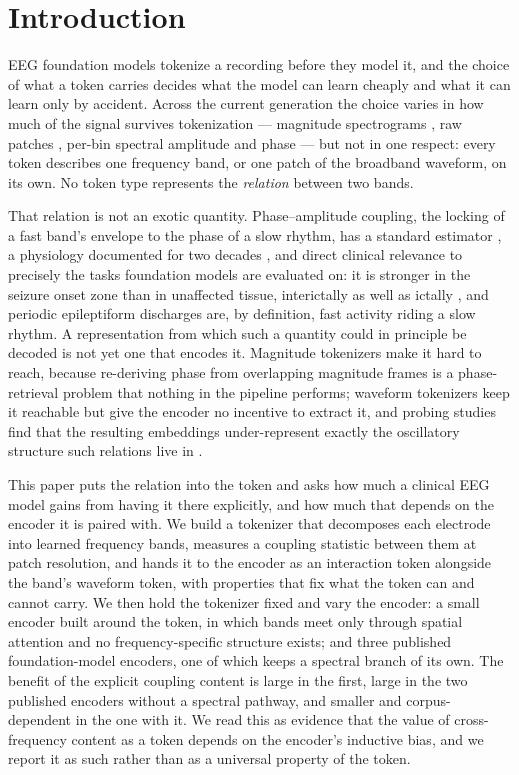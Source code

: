 \section{Introduction}
\label{sec:intro}

EEG foundation models tokenize a recording before they model it, and the
choice of what a token carries decides what the model can learn cheaply and
what it can learn only by accident. Across the current generation the
choice varies in how much of the signal survives tokenization --- magnitude
spectrograms \citep{yang2023biot,pradeepkumar2026tfm}, raw patches
\citep{wang2025cbramod,wang2024eegpt}, per-bin spectral amplitude and phase
\citep{jiang2024labram} --- but not in one respect: every token describes
one frequency band, or one patch of the broadband waveform, on its own. No
token type represents the \emph{relation} between two bands.

That relation is not an exotic quantity. Phase--amplitude coupling, the
locking of a fast band's envelope to the phase of a slow rhythm, has a
standard estimator \citep{tort2010measuring}, a physiology documented for
two decades \citep{canolty2006high,canolty2010functional}, and direct
clinical relevance to precisely the tasks foundation models are evaluated
on: it is stronger in the seizure onset zone than in unaffected tissue,
interictally as well as ictally \citep{amiri2016phase}, and periodic
epileptiform discharges are, by definition, fast activity riding a slow
rhythm. A representation from which such a quantity could in principle be
decoded is not yet one that encodes it. Magnitude tokenizers make it hard
to reach, because re-deriving phase from overlapping magnitude frames is a
phase-retrieval problem \citep{griffin1984signal} that nothing in the
pipeline performs; waveform tokenizers keep it reachable but give the
encoder no incentive to extract it, and probing studies find that the
resulting embeddings under-represent exactly the oscillatory structure
such relations live in \citep{kommineni2026aperiodic}.

This paper puts the relation into the token and asks how much a clinical
EEG model gains from having it there explicitly, and how much that depends
on the encoder it is paired with. We build a tokenizer that decomposes
each electrode into learned frequency bands, measures a coupling
statistic between them at patch resolution, and hands it to the encoder
as an interaction token alongside the band's waveform token, with
properties that fix what the token can and cannot carry. We then hold the
tokenizer fixed and vary the encoder: a small encoder built around the
token, in which bands meet only through spatial attention and no
frequency-specific structure exists; and three published foundation-model
encoders, one of which keeps a spectral branch of its own. The benefit of
the explicit coupling content is large in the first, large in the two
published encoders without a spectral pathway, and smaller and
corpus-dependent in the one with it. We read this as evidence that the
value of cross-frequency content as a token depends on the encoder's
inductive bias, and we report it as such rather than as a universal
property of the token.

